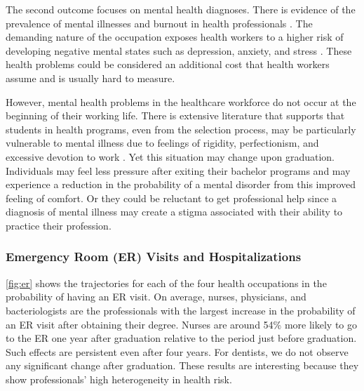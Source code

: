 \documentclass[12pt, a4paper]{article}
\begin{document}
The second outcome focuses on mental health diagnoses. There is evidence of the prevalence of mental illnesses and burnout in health professionals \citep{lai2020factors,young2021health,simon2022analisis,gold2013details,johnson2018mental,shanafelt2017executive, west2020resilience}. The demanding nature of the occupation exposes health workers to a higher risk of developing negative mental states such as depression, anxiety, and stress \citep{ghazwin2016association,huang2018risks,maharaj2019prevalence}. These health problems could be considered an additional cost that health workers assume and is usually hard to measure.

However, mental health problems in the healthcare workforce do not occur at the beginning of their working life. There is extensive literature that supports that students in health programs, even from the selection process, may be particularly vulnerable to mental illness due to feelings of rigidity, perfectionism, and excessive devotion to work \citep{mihailescu2019scoping,parsons2020evidence,afshar2022perceived,ferrel2011depresion}. Yet this situation may change upon graduation. Individuals may feel less pressure after exiting their bachelor programs and may experience a reduction in the probability of a mental disorder from this improved feeling of comfort. Or they could be reluctant to get professional help since a diagnosis of mental illness may create a stigma associated with their ability to practice their profession.


\subsubsection{Emergency Room (ER) Visits and Hospitalizations}
\autoref{fig:er} shows the trajectories for each of the four health occupations in the probability of having an ER visit. On average, nurses, physicians, and bacteriologists are the professionals with the largest increase in the probability of an ER visit after obtaining their degree. Nurses are around 54\% more likely to go to the ER one year after graduation relative to the period just before graduation. Such effects are persistent even after four years. For dentists, we do not observe any significant change after graduation. These results are interesting because they show professionals' high heterogeneity in health risk.
\end{document}

